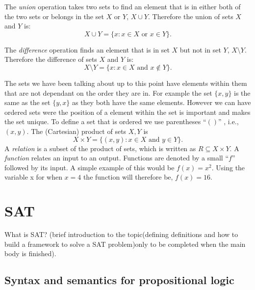 \documentclass[11pt,a4paper]{report}
\begin{document}
The \emph{union} operation takes two sets to find an element that is in either both of the two sets or belongs in the set $X$ or $Y$, $X \cup Y$. Therefore the union of sets $X$ and $Y$ is:
\begin{displaymath}
  X \cup Y = \{x : x \in X  \text{ or } x \in Y\}.
\end{displaymath}

The \emph{difference} operation finds an element that is in set $X$ but not in set $Y$, $X \setminus Y$. Therefore the difference of sets $X$ and $Y$ is:
\begin{displaymath}
  X \setminus Y = \{x : x \in X  \text{ and } x \notin Y\}.
\end{displaymath}

The sets we have been talking about up to this point have elements within them that are not dependant on the order they are in. For example the set $\{x,y\}$ is the same as the set $\{y, x\}$ as they both have the same elements. However we can have ordered sets were the position of a element within the set is important and makes the set unique. To define a set that is ordered we use parentheses  ``$()$'' , i.e., $(x,y)$. 
The (Cartesian) product of sets $X, Y$ is
\begin{displaymath}
  X \times Y = \{(x,y) : x \in X \text{ and } y \in Y\}.
\end{displaymath}
A \emph{relation} is a subset of the product of sets, which is written as $R \subseteq X \times Y$. A \emph{function} relates an input to an output. Functions are denoted by a small ``$f$'' followed by its input. A simple example of this would be $f(x) = x^2$. Using the variable x for when $x=4$ the function will therefore be, $f(x) = 16$.



\section{SAT}
\label{sec:SAT}

What is SAT? (brief introduction to the topic(defining definitions and how to build a framework to solve a SAT problem)only to be completed when the main body is finished).

\subsection{Syntax and semantics for propositional logic}
\label{sec:syntaxsem}
\end{document}
